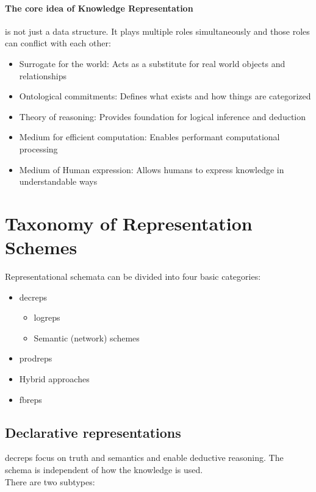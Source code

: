 \paragraph{The core idea of Knowledge Representation} is not just a data structure.
It plays multiple roles
simultaneously and those roles can conflict with each other:
\begin{itemize}
    \item Surrogate for the world: Acts as a substitute for real world objects and relationships
    \item Ontological commitments: Defines what exists and how things are categorized
    \item Theory of reasoning: Provides foundation for logical inference and deduction
    \item Medium for efficient computation: Enables performant computational processing
    \item Medium of Human expression: Allows humans to express knowledge in understandable ways
\end{itemize}


\section{Taxonomy of Representation Schemes}\label{sec:taxonomy-of-representation-schemes}
Representational schemata can be divided into four basic categories:
\begin{itemize}
    \item \Glspl{decrep}
    \begin{itemize}
        \item \Glspl{logrep}
        \item Semantic (network) schemes
    \end{itemize}
    \item \Glspl{prodrep}
    \item Hybrid approaches
    \item \Glspl{fbrep}
\end{itemize}

\subsection*{Declarative representations}

 \label{def:decrep}

\noindent \Glspl{decrep} focus on truth and semantics and enable deductive reasoning.
The schema is independent of how the knowledge is used. \\
There are two subtypes:

